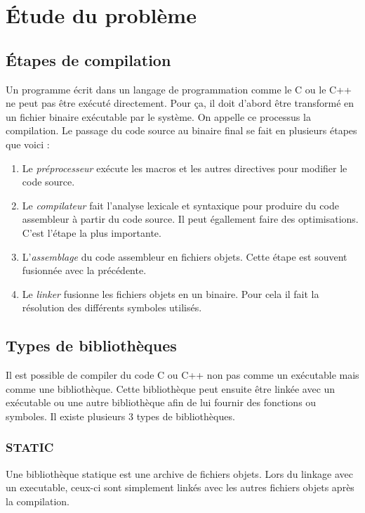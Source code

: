 \documentclass[a4paper]{report}
\begin{document}
    \section{Étude du problème}

        \subsection{Étapes de compilation}
            Un programme écrit dans un langage de programmation comme le C ou le C++ ne peut pas être exécuté directement.
            Pour ça, il doit d'abord être transformé en un fichier binaire exécutable par le système.
            On appelle ce processus la compilation.
            Le passage du code source au binaire final se fait en plusieurs étapes que voici :
            \begin{enumerate}
                \item Le \emph{préprocesseur} exécute les macros et les autres directives pour modifier le code source.
                \item Le \emph{compilateur} fait l'analyse lexicale et syntaxique pour produire du code assembleur à partir du code source.
                Il peut égallement faire des optimisations.
                C'est l'étape la plus importante.
                \item L'\emph{assemblage} du code assembleur en fichiers objets.
                Cette étape est souvent fusionnée avec la précédente.
                \item Le \emph{linker} fusionne les fichiers objets en un binaire.
                Pour cela il fait la résolution des différents symboles utilisés.
            \end{enumerate}

        \subsection{Types de bibliothèques}
            Il est possible de compiler du code C ou C++ non pas comme un exécutable mais comme une bibliothèque.
            Cette bibliothèque peut ensuite être linkée avec un exécutable ou une autre bibliothèque afin de lui fournir des fonctions ou symboles.
            Il existe plusieurs 3 types de bibliothèques.

            \subsubsection{STATIC}
                Une bibliothèque statique est une archive de fichiers objets.
                Lors du linkage avec un executable, ceux-ci sont simplement linkés avec les autres fichiers objets après la compilation.
\end{document}
